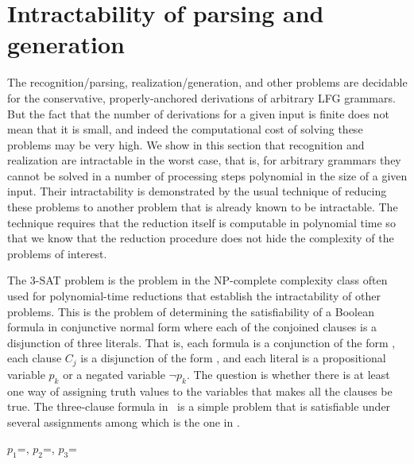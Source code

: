 \documentclass[output=paper,hidelinks]{langscibook}
\begin{document}
\section{Intractability of parsing and generation}\label{intractability}

The recognition/parsing,  realization/generation, and other problems are decidable for the conservative, properly-anchored derivations of arbitrary LFG grammars.  But the fact that the number of derivations for a given input is finite does not mean that it is small, and indeed the computational cost of solving these problems may be very high. We show in this section that recognition and realization are intractable in the worst case, that is, for arbitrary grammars they cannot be solved in a number of processing steps polynomial in the size of a given input. Their intractability is demonstrated by the usual technique of reducing these problems to another problem that is already known to be intractable. The technique requires that the reduction itself is computable in polynomial time so that we know that the reduction procedure does not hide the complexity of the problems of interest.

The 3-SAT problem is the problem in the \textsf{NP}-complete complexity class often used for polynomial-time reductions that establish the intractability of other problems. This is the problem of determining the satisfiability of a Boolean formula in conjunctive normal form where each of the conjoined clauses is a disjunction of three literals. That is, each formula is a conjunction of the form  , each clause $C_j$ is a disjunction of the form , and each literal  is a propositional variable $p_k$ or a negated variable \mbox{$\lnot{p_k}$}.  The question is whether there is at least one way of assigning truth values to the variables that makes all the clauses be true. The three-clause formula in~ is a simple problem that is satisfiable under several assignments among which is the one in .

\ea
\ea\label{CNFex} 
\ex\label{CNFexass} \mbox{$p_1$=}, \mbox{$p_2$=}, \mbox{$p_3$=}
\z
\z
\end{document}
